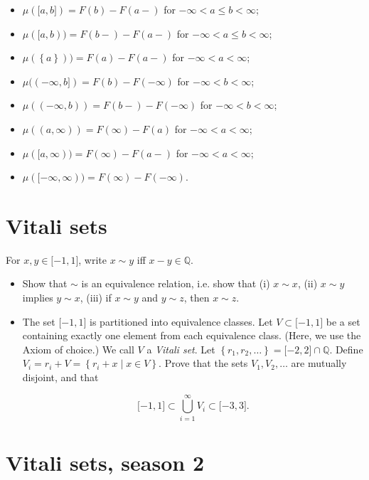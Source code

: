 \documentclass{qlnotes-export}
\begin{document}
\begin{itemize}
\item
  \(\mu(\lbrack a,b\rbrack) = F(b) - F(a - )\) for \(- \infty < a \leq b < \infty\);
\item
  \(\mu(\lbrack a,b)) = F(b - ) - F(a - )\) for \(- \infty < a \leq b < \infty\);
\item
  \(\mu(\left\{ a \right\})) = F(a) - F(a - )\) for \(- \infty < a < \infty\);
\item
  \(\mu(( - \infty,b\rbrack) = F(b) - F( - \infty)\) for \(- \infty < b < \infty\);
\item
  \(\mu(( - \infty,b)) = F(b - ) - F( - \infty)\) for \(- \infty < b < \infty\);
\item
  \(\mu((a,\infty)) = F(\infty) - F(a)\) for \(- \infty < a < \infty\);
\item
  \(\mu(\lbrack a,\infty)) = F(\infty) - F(a - )\) for \(- \infty < a < \infty\);
\item
  \(\mu(\lbrack - \infty,\infty)) = F(\infty) - F( - \infty)\).
\end{itemize}

\section{Vitali sets}\label{vitali-sets}

For \(x,y \in \lbrack - 1,1\rbrack\), write \(x \sim y\) iff \(x - y \in {\mathbb{Q}}\).

\begin{itemize}
\item
  Show that \(\sim\) is an equivalence relation, i.e. show that (i) \(x \sim x\), (ii) \(x \sim y\) implies \(y \sim x\), (iii) if \(x \sim y\) and \(y \sim z\), then \(x \sim z\).
\item
  The set \(\lbrack - 1,1\rbrack\) is partitioned into equivalence classes. Let \(V \subset \lbrack - 1,1\rbrack\) be a set containing exactly one element from each equivalence class. (Here, we use the Axiom of choice.) We call \(V\) a \emph{Vitali set}. Let \(\left\{ {r_{1},r_{2},\ldots} \right\} = \lbrack - 2,2\rbrack \cap {\mathbb{Q}}\). Define \(V_{i} = r_{i} + V = \left\{ {r_{i} + x \mid x \in V} \right\}\). Prove that the sets \(V_{1},V_{2},\ldots\) are mutually disjoint, and that

  \[\lbrack - 1,1\rbrack \subset \bigcup\limits_{i = 1}^{\infty}V_{i} \subset \lbrack - 3,3\rbrack.\]
\end{itemize}

\section{Vitali sets, season 2}\label{vitali-sets-season-2}
\end{document}
